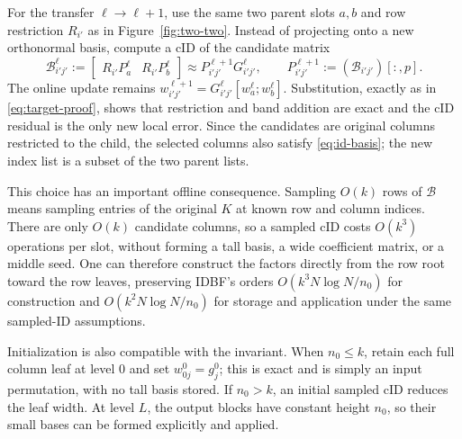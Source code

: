 \documentclass[11pt]{article}
\begin{document}
For the transfer $\ell\to\ell+1$, use the same two parent slots $a,b$ and row restriction $R_{i'}$ as in Figure~\ref{fig:two-two}.  Instead of projecting onto a new orthonormal basis, compute a cID of the candidate matrix
\[
 \mathcal B_{i'j'}^{\ell}:=
 \begin{bmatrix}R_{i'}P_a^\ell&R_{i'}P_b^\ell\end{bmatrix}
 \approx P_{i'j'}^{\ell+1}G_{i'j'}^{\ell},
 \qquad
 P_{i'j'}^{\ell+1}:=(\mathcal B_{i'j'})[:,p].
 \tag{22}\label{eq:id-transfer}
\]
The online update remains $w_{i'j'}^{\ell+1}=G_{i'j'}^{\ell}[w_a^\ell;w_b^\ell]$.  Substitution, exactly as in \eqref{eq:target-proof}, shows that restriction and band addition are exact and the cID residual is the only new local error.  Since the candidates are original columns restricted to the child, the selected columns also satisfy \eqref{eq:id-basis}; the new index list is a subset of the two parent lists.

This choice has an important offline consequence.  Sampling $O(k)$ rows of $\mathcal B$ means sampling entries of the original $K$ at known row and column indices.  There are only $O(k)$ candidate columns, so a sampled cID costs $O(k^3)$ operations per slot, without forming a tall basis, a wide coefficient matrix, or a middle seed.  One can therefore construct the factors directly from the row root toward the row leaves, preserving IDBF's orders $O(k^3N\log N/n_0)$ for construction and $O(k^2N\log N/n_0)$ for storage and application under the same sampled-ID assumptions.

Initialization is also compatible with the invariant.  When $n_0\le k$, retain each full column leaf at level $0$ and set $w_{0j}^0=g_j^0$; this is exact and is simply an input permutation, with no tall basis stored.  If $n_0>k$, an initial sampled cID reduces the leaf width.  At level $L$, the output blocks have constant height $n_0$, so their small bases can be formed explicitly and applied.

\begin{center}
\end{center}
\end{document}

